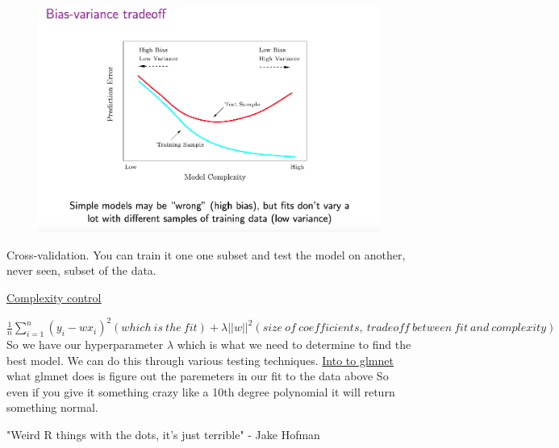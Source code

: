 \begin{figure}[ht]
  \begin{center}
    \includegraphics[width=1.0\textwidth]{figures/ScreenShot2.png}
 
  \end{center}
\end{figure}

Cross-validation. You can train it one one subset and test the model on another, never seen, subset of the data.

\href{https://github.com/jhofman/msd2019/blob/master/lectures/lecture_8/complexity_control.ipynb
}{Complexity control}


$\frac{1}{n}\sum_{i=1}^n (y_i - w x_i)^2 (which ~is~ the~ fit) + \lambda ||{w}||^2 (size~ of~ coefficients,~ tradeoff~ between ~ fit ~ and ~ complexity)$ 
So we have our hyperparameter $\lambda$ which is what we need to determine to find the best model. We can do this through various testing techniques. 
\href{https://github.com/jhofman/msd2019/blob/master/lectures/lecture_8/intro_to_glmnet.ipynb}{Into to glmnet} what glmnet does is figure out the paremeters in our fit to the data above
So even if you give it something crazy like a 10th degree polynomial it will return something normal.

"Weird R things with the dots, it's just terrible" - Jake Hofman
